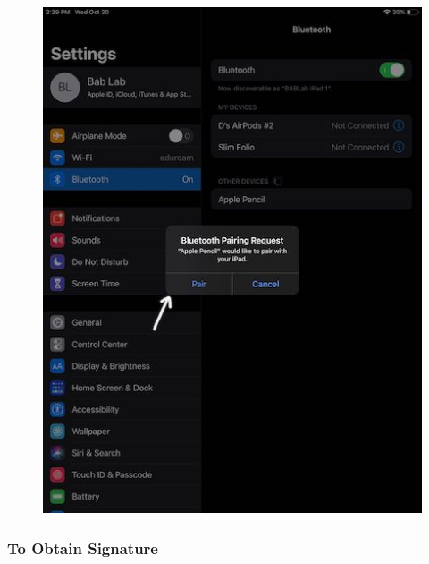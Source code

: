 \documentclass[]{book}
\begin{document}
\begin{itemize}
  \begin{figure}
  \centering
  \includegraphics{images/payment/2.jpeg}
  \caption{}
  \end{figure}
\end{itemize}

\hypertarget{to-obtain-signature}{%
\subsubsection{To Obtain Signature}\label{to-obtain-signature}}
\end{document}
